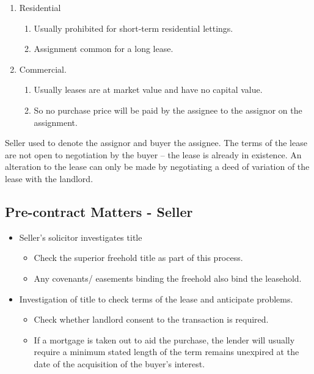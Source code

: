 \documentclass[
]{article}
\providecommand{\tightlist}{%
  \setlength{\itemsep}{0pt}\setlength{\parskip}{0pt}}
\begin{document}
\begin{enumerate}
\tightlist
\item
  Residential

  \begin{enumerate}
  \tightlist
  \item
    Usually prohibited for short-term residential lettings.
  \item
    Assignment common for a long lease.
  \end{enumerate}
\item
  Commercial.

  \begin{enumerate}
  \tightlist
  \item
    Usually leases are at market value and have no capital value.
  \item
    So no purchase price will be paid by the assignee to the assignor on
    the assignment.
  \end{enumerate}
\end{enumerate}

Seller used to denote the assignor and buyer the assignee. The terms of
the lease are not open to negotiation by the buyer -- the lease is
already in existence. An alteration to the lease can only be made by
negotiating a deed of variation of the lease with the landlord.

\hypertarget{pre-contract-matters---seller}{%
\subsection{Pre-contract Matters -
Seller}\label{pre-contract-matters---seller}}

\begin{itemize}
\tightlist
\item
  Seller's solicitor investigates title

  \begin{itemize}
  \tightlist
  \item
    Check the superior freehold title as part of this process.
  \item
    Any covenants/ easements binding the freehold also bind the
    leasehold.
  \end{itemize}
\item
  Investigation of title to check terms of the lease and anticipate
  problems.

  \begin{itemize}
  \tightlist
  \item
    Check whether landlord consent to the transaction is required.
  \item
    If a mortgage is taken out to aid the purchase, the lender will
    usually require a minimum stated length of the term remains
    unexpired at the date of the acquisition of the buyer's interest.
  \end{itemize}
\end{itemize}
\end{document}
